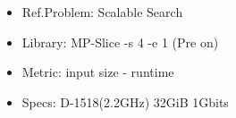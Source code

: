 \begin{frame}
\begin{minipage}{.41\paperwidth}
\begin{figure}
        \begin{itemize}
            \item Ref.Problem: Scalable Search
            \item Library: MP-Slice -s 4 -e 1 (Pre on)
            \item Metric: input size - runtime
            \item Specs: D-1518(2.2GHz) 32GiB 1Gbits
        \end{itemize}
    \end{figure}
    \end{minipage}

\end{frame}

